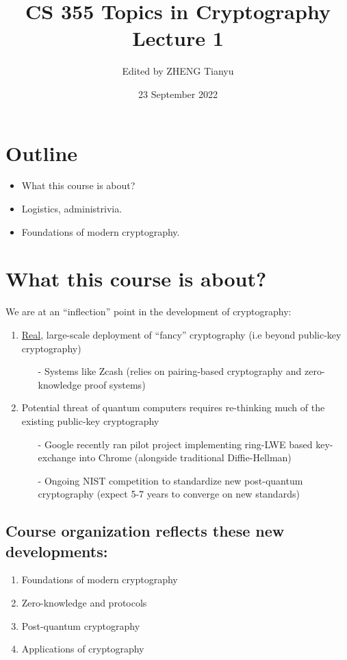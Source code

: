 \documentclass{article}
\title{\textbf{CS 355 Topics in Cryptography} \\ Lecture 1}
\author{Edited by ZHENG Tianyu}
\date{23 September 2022}
\begin{document}
\maketitle

\section*{Outline}
\begin{itemize}
    \item What this course is about?
    \item Logistics, administrivia.
    \item Foundations of modern cryptography.
\end{itemize}

\section{What this course is about?}


We are at an ``inflection'' point in the development of cryptography:
\begin{enumerate}
    \item \underline{Real}, large-scale deployment of ``fancy'' cryptography (i.e beyond public-key cryptography)
    \begin{itemize}
        \item[-] Systems like Zcash (relies on pairing-based cryptography and zero-knowledge proof systems)
    \end{itemize}
    
    \item Potential threat of quantum computers requires re-thinking much of the existing public-key cryptography
    \begin{itemize}
        \item[-] Google recently ran pilot project implementing ring-LWE based key-exchange into Chrome (alongside traditional Diffie-Hellman)
        \item[-] Ongoing NIST competition to standardize new post-quantum cryptography (expect 5-7 years to converge on new standards)
    \end{itemize}
\end{enumerate}

\subsection{Course organization reflects these new developments:}
\begin{enumerate}
    \item Foundations of modern cryptography
    \item Zero-knowledge and protocols
    \item Post-quantum cryptography
    \item Applications of cryptography
\end{enumerate}
\end{document}
